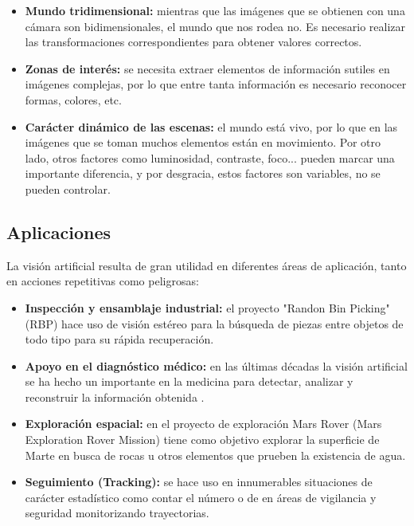 \begin{itemize}
  \item \textbf{Mundo tridimensional:} mientras que las imágenes que se
  obtienen con una cámara son bidimensionales, el mundo que nos rodea no. Es
  necesario realizar las transformaciones correspondientes para obtener valores
  correctos.
  \item \textbf{Zonas de interés:} se necesita extraer elementos de información 
  sutiles en imágenes complejas, por lo que entre tanta información es
  necesario reconocer formas, colores, etc.
  \item \textbf{Carácter dinámico de las escenas:} el mundo está vivo, por lo
  que en las imágenes que se toman muchos elementos están en movimiento. Por 
  otro lado, otros factores como luminosidad, contraste, foco... pueden marcar
  una importante diferencia, y por desgracia, estos factores son variables, no
  se pueden controlar.
\end{itemize}

\subsection{Aplicaciones}
La visión artificial resulta de gran utilidad en diferentes áreas de
aplicación, tanto en acciones repetitivas como peligrosas:

\begin{itemize}
  \item \textbf{Inspección y ensamblaje industrial:} el proyecto "Randon Bin
  Picking" (RBP) \cite{AplicacionesRBP} hace uso de visión estéreo para la
  búsqueda de piezas entre objetos de todo tipo para su rápida recuperación.
  \item \textbf{Apoyo en el diagnóstico médico:} en las últimas décadas la
  visión artificial se ha hecho un importante en la medicina para detectar,
  analizar y reconstruir la información obtenida \cite{AplicacionesDiagnostico}.
  \item \textbf{Exploración espacial:} en el proyecto de exploración Mars Rover
  (Mars Exploration Rover Mission) \cite{AplicacionesRovers} tiene como objetivo
  explorar la superficie de Marte en busca de rocas u otros elementos que
  prueben la existencia de agua.
  \item \textbf{Seguimiento (Tracking):} se hace uso en innumerables
  situaciones de carácter estadístico como contar el número o de en áreas de
  vigilancia y seguridad monitorizando trayectorias.
\end{itemize}

